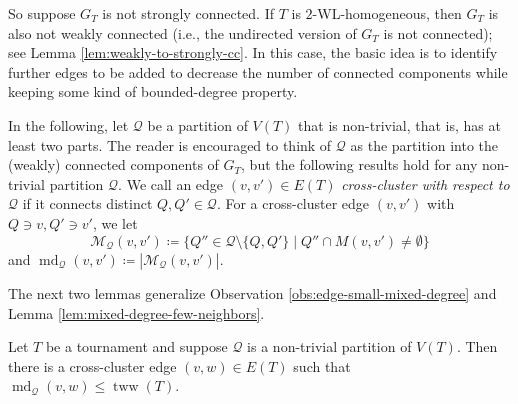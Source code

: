 \documentclass{theoretics}
\newcommand{\CM}{{\mathcal M}}
\newcommand{\CQ}{{\mathcal Q}}
\newcommand{\bigmid}{\;\big|\;}
\DeclareMathOperator{\md}{md}
\DeclareMathOperator{\tww}{tww}
\begin{document}
So suppose $G_T$ is not strongly connected.
If $T$ is $2$-WL-homogeneous, then $G_T$ is also not weakly connected (i.e., the undirected version of $G_T$ is not connected); see Lemma \ref{lem:weakly-to-strongly-cc}.
In this case, the basic idea is to identify further edges to be added to decrease the number of connected components while keeping some kind of bounded-degree property.

In the following, let $\CQ$ be a partition of $V(T)$ that is non-trivial, that is, has at least two parts.
The reader is encouraged to think of $\CQ$ as the partition into the (weakly) connected components of $G_T$, but the following results hold for any non-trivial partition $\CQ$.
We call an edge $(v,v') \in E(T)$ \emph{cross-cluster with respect to $\CQ$} if it connects distinct $Q,Q' \in \CQ$.
For a cross-cluster edge $(v,v')$ with $Q \owns v, Q'\owns v'$, we let
\[\CM_{\CQ}(v,v') \coloneqq \big\{ Q'' \in \CQ \setminus \{Q,Q'\} \bigmid Q'' \cap M(v,v') \neq \emptyset \big\}\]
and $\md_\CQ(v,v') \coloneqq |\CM_\CQ(v,v')|$.

The next two lemmas generalize Observation \ref{obs:edge-small-mixed-degree} and Lemma \ref{lem:mixed-degree-few-neighbors}.

\begin{lemma}
 \label{lem:edge-small-mixed-degree}
 Let $T$ be a tournament and suppose $\CQ$ is a non-trivial partition of $V(T)$.
 Then there is a cross-cluster edge $(v,w)\in E(T)$ such that $\md_\CQ(v,w) \leq \tww(T)$.
\end{lemma}
\end{document}
